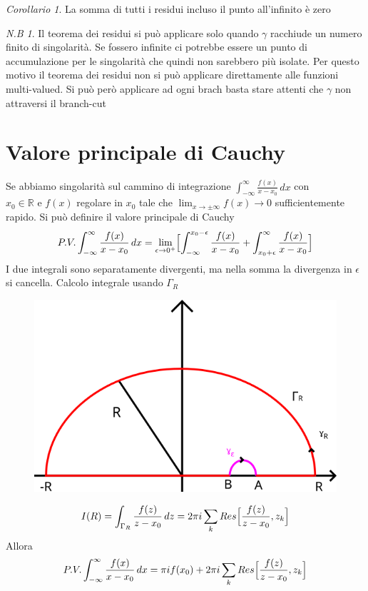 \documentclass[a4paper,11pt]{report}
\theoremstyle{remark}
\newtheorem*{nb}{N.B}
\newtheorem*{coro}{Corollario}
\theoremstyle{definition}
\newcommand{\R}{\mathbb{R}}
\begin{document}
	\begin{coro}
		La somma di tutti i residui incluso il punto all'infinito è zero
	\end{coro}

	\begin{nb}
		Il teorema dei residui si può applicare solo quando $\gamma$ racchiude un numero finito di singolarità. Se fossero infinite ci potrebbe essere un punto di accumulazione per le singolarità che quindi non sarebbero più isolate. Per questo motivo il teorema dei residui non si può applicare direttamente alle funzioni multi-valued. Si può però applicare ad ogni brach basta stare attenti che $\gamma$ non attraversi il branch-cut
	\end{nb}

\section{Valore principale di Cauchy}

	Se abbiamo singolarità sul cammino di integrazione $\int_{-\infty}^{\infty} \frac{f(x)}{x-x_0}\,dx$ con $x_0 \in \R \text{ e } f(x)$ regolare in $x_0$ tale che $\displaystyle \lim_{x \to \pm\infty} f(x) \to 0$ sufficientemente rapido. \newline
	Si può definire il valore principale di Cauchy 
	\[P.V. \int_{-\infty}^{\infty} \frac{f(x)}{x-x_0}\,dx = \lim_{\epsilon \to 0^+} \Bigl[\int_{-\infty}^{x_0-\epsilon}\frac{f(x)}{x-x_0} + \int_{x_0+\epsilon}^{\infty} \frac{f(x)}{x-x_0}\Bigr]\]
	I due integrali sono separatamente divergenti, ma nella somma la divergenza in $\epsilon$ si cancella. \newline
	Calcolo integrale usando $\Gamma_R$
	\begin{figure}[H]
		\centering
		\includegraphics[width=0.5\linewidth]{immagini/fig1}
		\label{fig:fig1}
	\end{figure}

	\[I(R) = \int_{\Gamma_R} \frac{f(z)}{z-x_0}\,dz = 2\pi i \sum_k Res\Bigl[\frac{f(z)}{z-x_0},z_k\Bigr]\]
	Allora
	\begin{equation}
		P.V. \int_{-\infty}^{\infty} \frac{f(x)}{x-x_0}\,dx = \pi i f(x_0) + 2\pi i \sum_k Res\Bigl[\frac{f(z)}{z-x_0},z_k\Bigr]
	\end{equation}
\end{document}

